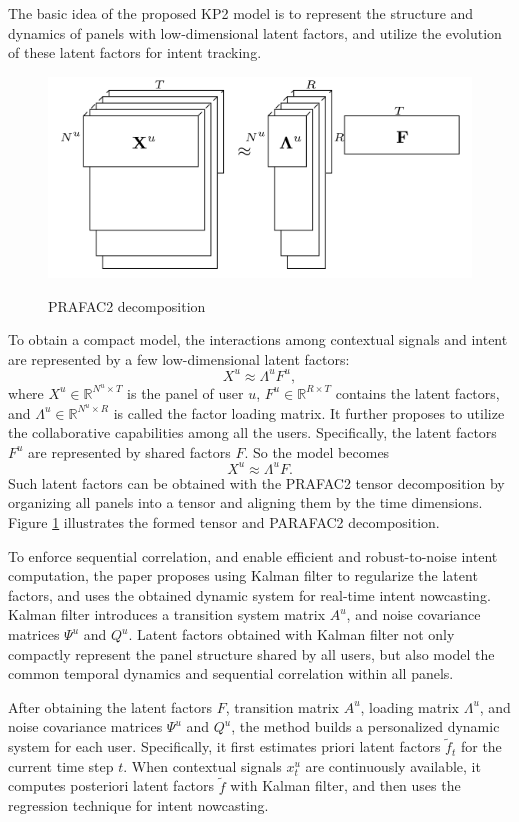\documentclass[paper=a4, fontsize=18pt]{article} %
\numberwithin{equation}{section} %
\numberwithin{figure}{section} %
\numberwithin{table}{section} %
\begin{document}
The basic idea of the proposed KP2 model is to represent the structure and dynamics of panels with low-dimensional latent factors, and utilize the evolution of these latent factors for intent tracking.

\begin{figure}[h]
  \centering
  \includegraphics[width=.5\linewidth]{8_22_ccf.png}\\
  \caption{PRAFAC2 decomposition}\label{fig:ccf1}
\end{figure}

To obtain a compact model, the interactions among contextual signals and intent are represented by a few low-dimensional latent factors:
$$X^u \approx \Lambda^u F^u,$$
where $X^u \in \mathbb{R}^{N^u \times T}$ is the panel of user $u$, $F^u \in \mathbb{R}^{R \times T}$ contains the latent factors, and $\Lambda^u \in \mathbb{R}^{N^u \times R}$ is called the factor loading matrix. It further proposes to utilize the collaborative capabilities among all the users. Specifically, the latent factors $F^u$ are represented by shared factors $F$. So the model becomes
$$X^u \approx \Lambda^u F.$$
Such latent factors can be obtained with the PRAFAC2 tensor decomposition by organizing all panels into a tensor and aligning them by the time dimensions. Figure \ref{fig:ccf1} illustrates the formed tensor and PARAFAC2 decomposition.

To enforce sequential correlation, and enable efficient and robust-to-noise intent computation, the paper proposes using Kalman filter to regularize the latent factors, and uses the obtained dynamic system for real-time intent nowcasting. Kalman filter introduces a transition system matrix $A^u$, and noise covariance matrices $\Psi^u$ and $Q^u$. Latent factors obtained with Kalman filter not only compactly represent the panel structure shared by all users, but also model the common temporal dynamics and sequential correlation within all panels.

After obtaining the latent factors $F$, transition matrix $A^u$, loading matrix $\Lambda^u$, and noise covariance matrices $\Psi^u$ and $Q^u$, the method builds a personalized dynamic system for each user. Specifically, it first estimates priori latent factors $\tilde{f}_t$ for the current time step $t$. When contextual signals $x_t^u$ are continuously available, it computes posteriori latent factors $\tilde{f}$ with Kalman filter, and then uses the regression technique for intent nowcasting.
\end{document}
